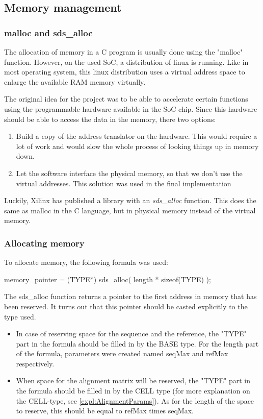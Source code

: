 \subsection{Memory management}

\subsubsection{malloc and sds\_alloc}
The allocation of memory in a C program is usually done using the "malloc" function. However, on the used SoC, a distribution of linux is running. Like in most operating system, this linux distribution uses a virtual address space to enlarge the available RAM memory virtually. 

The original idea for the project was to be able to accelerate certain functions using the programmable hardware available in the SoC chip. Since this hardware should be able to access the data in the memory, there two options:
\begin{enumerate}
	\item Build a copy of the address translator on the hardware. This would require a lot of work and would slow the whole process of looking things up in memory down.
	\item Let the software interface the physical memory, so that we don't use the virtual addresses. This solution was used in the final implementation
\end{enumerate}

Luckily, Xilinx has published a library with an \emph{sds\_alloc} function. This does the same as malloc in the C language, but in physical memory instead of the virtual memory.

\subsubsection{Allocating memory}
To allocate memory, the following formula was used:

\begin{lcverbatim}
	memory_pointer = (TYPE*) sds_alloc( length * sizeof(TYPE) );
\end{lcverbatim}

The sds\_alloc function returns a pointer to the first address in memory that has been reserved. It turns out that this pointer should be casted explicitly to the type used.

\begin{itemize}
	\item In case of reserving space for the sequence and the reference, the "TYPE" part in the formula should be filled in by the BASE type. For the length part of the formula, parameters were created named seqMax and refMax respectively.
	\item When space for the alignment matrix will be reserved, the "TYPE" part in the formula should be filled in by the CELL type (for more explanation on the CELL-type, see \ref{expl:AlignmentParams}). As for the length of the space to reserve, this should be equal to refMax times seqMax.
\end{itemize}

